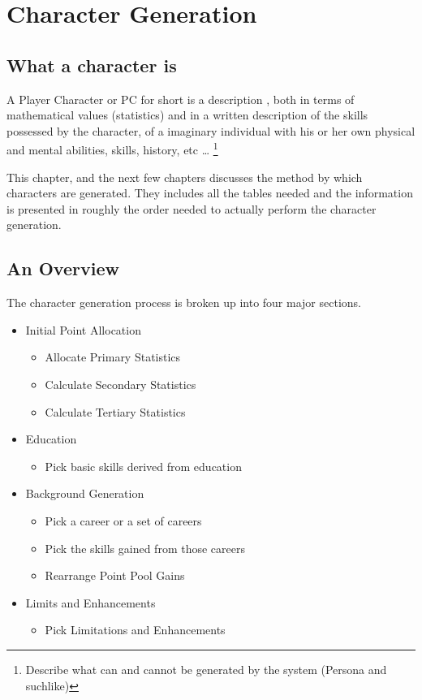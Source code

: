 \chapter{Character Generation}

\section{What a character is}
A Player Character or PC for short is a description , both in terms of 
mathematical values (statistics) and in a written description of the 
skills possessed by the character, of a imaginary individual with his 
or her own physical and mental abilities, skills, history,  etc \dots
\footnote{Describe what can and cannot be generated by the system 
(Persona and suchlike) }

This chapter, and the next few chapters discusses the method by which 
characters are generated. They includes all the tables needed and the 
information is presented in roughly the order needed to actually perform 
the character generation. 

\section{An Overview}

The character generation process is broken up into four major sections.

\begin{itemize}
	\item Initial Point Allocation
    	\begin{itemize}
        	\item Allocate Primary Statistics
            \item Calculate Secondary Statistics
            \item Calculate Tertiary Statistics
        \end{itemize}
    \item Education
    	\begin{itemize}
        	\item Pick basic skills derived from education
        \end{itemize}
    \item Background Generation
    	\begin{itemize}
        	\item Pick a career or a set of careers
        	\item Pick the skills gained from those careers
        	\item Rearrange Point Pool Gains
        \end{itemize}
    \item Limits and Enhancements
    	\begin{itemize}
        	\item Pick Limitations and Enhancements
        \end{itemize}
\end{itemize}
	


